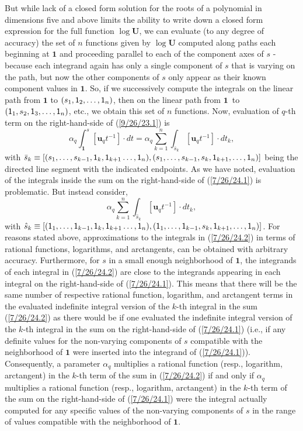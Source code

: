 \documentclass{amsart}
\numberwithin{equation}{section}
\theoremstyle{definition}
\numberwithin{theorem}{section}
\begin{document}
But while lack of a closed form solution for the roots of a polynomial in dimensions five and above limits the ability to write down a closed form expression for the full function $\log\mathbf{U}$, we can evaluate (to any degree of accuracy) the set of $n$ functions given by $\log\mathbf{U}$ computed along paths each beginning at $\mathbf{1}$ and proceeding parallel to each of the component axes of $s$ - because each integrand again has only a single component of $s$ that is varying on the path, but now the other components of $s$ only appear as their known component values in $\mathbf{1}$.  
So, if we successively compute the integrals on the linear path from $\mathbf{1}$ to $(s_1,{\sf 1}_2,\dots,{\sf 1}_n)$, then on the linear path from \mbox{$\mathbf{1}$ to} $({\sf 1}_1,s_2,{\sf 1}_3,\dots,{\sf 1}_n)$, etc., we obtain this set of $n$ functions. \enlargethispage{1cm} Now, evaluation of $q$-th term on the right-hand-side of (\ref{9/26/23.1}) is \begin{equation}\label{7/26/24.1} \alpha_q\int_{\mathbf{1}}^s [\mathbf{u}_q t^{-1}]\cdot dt = \alpha_q\sum_{k=1}^n \int_{\bar{s}_k} [\mathbf{u}_q t^{-1}]\cdot dt_k,\end{equation} with $\bar{s}_k \equiv [(s_1,\dots,s_{k-1},{\sf 1}_{k},{\sf 1}_{k+1}\dots,{\sf 1}_n),(s_1,\dots,s_{k-1},s_k,{\sf 1}_{k+1},\dots,{\sf 1}_n)]$ being the directed line segment with the indicated endpoints.   As we have noted, evaluation of the integrals inside the sum on the right-hand-side of (\ref{7/26/24.1}) is problematic.  But instead consider,  \begin{equation}\label{7/26/24.2}\alpha_q\sum_{k=1}^n \int_{\hat{s}_k} [\mathbf{u}_q t^{-1}]\cdot dt_k,\end{equation} with $\hat{s}_k \equiv [({\sf 1}_1,\dots,{\sf 1}_{k-1},{\sf 1}_{k},{\sf 1}_{k+1}\dots,{\sf 1}_n),({\sf 1}_1,\dots,{\sf 1}_{k-1},s_k,{\sf 1}_{k+1},\dots,{\sf 1}_n)]$. 
For reasons stated above, approximations to the integrals in (\ref{7/26/24.2}) in terms of rational functions, logarithms, and arctangents, can be obtained with arbitrary accuracy.  Furthermore, for $s$ in a small enough neighborhood of $\mathbf{1}$, the integrands of each integral in (\ref{7/26/24.2}) are close to the integrands appearing in each integral on the right-hand-side of (\ref{7/26/24.1}).  This means that there will be the same number of respective rational function, logarithm, and arctangent terms in the evaluated indefinite integral version of the $k$-th integral in the sum (\ref{7/26/24.2}) as there would be if one evaluated the indefinite integral version of the $k$-th integral in the sum on the right-hand-side of (\ref{7/26/24.1}) (i.e., if any definite values for the non-varying components of $s$ compatible with the neighborhood of $\mathbf{1}$ were inserted into the integrand of (\ref{7/26/24.1})).  Consequently, a parameter $\alpha_q$ multiplies a rational function (resp., logarithm, arctangent) in the $k$-th term of the sum in (\ref{7/26/24.2}) if and only if $\alpha_q$ multiplies a rational function (resp., logarithm, arctangent) in the $k$-th term of the sum on the right-hand-side of (\ref{7/26/24.1}) were the integral actually computed for any specific values of the non-varying components of $s$ in the range of values compatible with the neighborhood of $\mathbf{1}$.  
\end{document}
